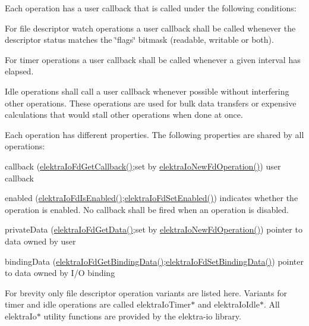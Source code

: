 Each operation has a user callback that is called under the following conditions\+:
\begin{DoxyItemize}
\item For file descriptor watch operations a user callback shall be called whenever the descriptor status matches the \char`\"{}flags\char`\"{} bitmask (readable, writable or both).
\item For timer operations a user callback shall be called whenever a given interval has elapsed.
\item Idle operations shall call a user callback whenever possible without interfering other operations. These operations are used for bulk data transfers or expensive calculations that would stall other operations when done at once.
\end{DoxyItemize}

Each operation has different properties. The following properties are shared by all operations\+:
\begin{DoxyItemize}
\item callback (\mbox{\hyperlink{io_8c_a885381fdd55cf957af1d65db7522899a}{elektra\+Io\+Fd\+Get\+Callback()}};set by \mbox{\hyperlink{io_8c_a3804183da1aecdfcf09455d246c3891c}{elektra\+Io\+New\+Fd\+Operation()}}) user callback
\item enabled (\mbox{\hyperlink{io_8c_af35cfd8a33db0170e06cb8c3cdc08244}{elektra\+Io\+Fd\+Is\+Enabled()}};\mbox{\hyperlink{io_8c_a56f8b0059e6c7708681624d1994e4b44}{elektra\+Io\+Fd\+Set\+Enabled()}}) indicates whether the operation is enabled. No callback shall be fired when an operation is disabled.
\item private\+Data (\mbox{\hyperlink{io_8c_a6a2a281c9e437dd1d660f1310fa06108}{elektra\+Io\+Fd\+Get\+Data()}};set by \mbox{\hyperlink{io_8c_a3804183da1aecdfcf09455d246c3891c}{elektra\+Io\+New\+Fd\+Operation()}}) pointer to data owned by user
\item binding\+Data (\mbox{\hyperlink{io_8c_a6103b457ed1440d0490acf0a6ec17386}{elektra\+Io\+Fd\+Get\+Binding\+Data()}};\mbox{\hyperlink{io_8c_ae02ec122aafa67b7dd92d9c3daa6499e}{elektra\+Io\+Fd\+Set\+Binding\+Data()}}) pointer to data owned by I/O binding
\end{DoxyItemize}

For brevity only file descriptor operation variants are listed here. Variants for timer and idle operations are called {\ttfamily elektra\+Io\+Timer$\ast$} and {\ttfamily elektra\+Io\+Idle$\ast$}. All {\ttfamily elektra\+Io$\ast$} utility functions are provided by the {\ttfamily elektra-\/io} library.

